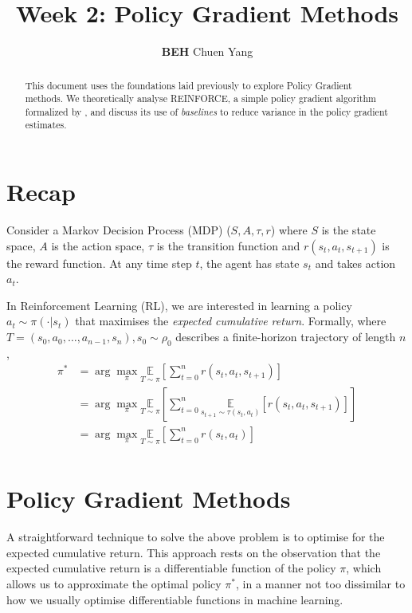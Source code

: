 \documentclass{article} %
\title{Week 2: Policy Gradient Methods}
\author{\textbf{BEH} Chuen Yang}
\begin{document}
\ifcolmsubmission
\linenumbers
\fi

\maketitle

\begin{abstract}
This document uses the foundations laid previously to explore Policy Gradient methods.
We theoretically analyse REINFORCE, a simple policy gradient algorithm formalized by \cite{Williams-1992},
and discuss its use of \textit{baselines} to reduce variance in the policy gradient estimates.
\end{abstract}

\section{Recap}

Consider a Markov Decision Process (MDP) ($S, A, \tau, r$) where $S$ is the state space, $A$ is the action space, 
$\tau$ is the transition function and $r(s_t, a_t, s_{t + 1})$ is the reward function.
At any time step $t$, the agent has state $s_t$ and takes action $a_t$.

In Reinforcement Learning (RL), we are interested in learning a policy $a_t \sim \pi(\cdot | s_t)$ that maximises the 
\textit{expected cumulative return}.
Formally, where $T = (s_0, a_0, \dots, a_{n - 1}, s_n), s_0 \sim \rho_0$ describes a finite-horizon trajectory of length $n$,
\begin{equation} \label{mdp_obj}
    \begin{aligned}
    \pi^* & = \arg\max_\pi \underset{T \sim \pi}{\mathbb{E}} \left[ \sum_{t=0}^{n} r(s_t, a_t, s_{t + 1}) \right] \\
          & = \arg\max_\pi \underset{T \sim \pi}{\mathbb{E}} \left[ \sum_{t=0}^{n}  \underset{s_{t + 1} \sim \tau  (s_t, a_t)}{\mathbb{E}}[r(s_t, a_t, s_{t + 1})]\right] \\
          & = \arg\max_\pi \underset{T \sim \pi}{\mathbb{E}} \left[ \sum_{t=0}^{n}  r(s_t, a_t)\right] \\
    \end{aligned}
\end{equation}

\section{Policy Gradient Methods}

A straightforward technique to solve the above problem is to optimise for the expected cumulative return.
This approach rests on the observation that the expected cumulative return is a differentiable function of the policy $\pi$,
which allows us to approximate the optimal policy $\pi^*$, in a manner not too dissimilar to how we usually
optimise differentiable functions in machine learning.
\end{document}
